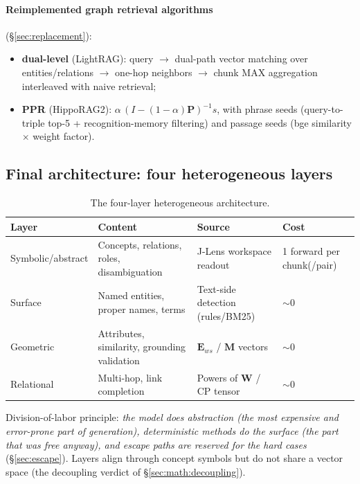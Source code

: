 \paragraph{Reimplemented graph retrieval algorithms} (\S\ref{sec:replacement}):
\begin{itemize}
\item \textbf{dual-level} (LightRAG): query $\to$ dual-path vector matching
over entities/relations $\to$ one-hop neighbors $\to$ chunk MAX aggregation
interleaved with naive retrieval;
\item \textbf{PPR} (HippoRAG2): $\alpha\,(I - (1-\alpha)\mathbf{P})^{-1} s$,
with phrase seeds (query-to-triple top-5 + recognition-memory filtering) and
passage seeds (bge similarity $\times$ weight factor).
\end{itemize}

\subsection{Final architecture: four heterogeneous layers}
\label{sec:method:arch}

\begin{table}[t]
\centering
\caption{The four-layer heterogeneous architecture.}
\label{tab:arch}
\begin{tabular}{@{}llll@{}}
\toprule
Layer & Content & Source & Cost \\
\midrule
Symbolic/abstract & Concepts, relations, roles, disambiguation & J-Lens workspace readout & 1 forward per chunk(/pair) \\
Surface & Named entities, proper names, terms & Text-side detection (rules/BM25) & $\sim 0$ \\
Geometric & Attributes, similarity, grounding validation & $\mathbf{E}_{ws}$ / $\mathbf{M}$ vectors & $\sim 0$ \\
Relational & Multi-hop, link completion & Powers of $\mathbf{W}$ / CP tensor & $\sim 0$ \\
\bottomrule
\end{tabular}
\end{table}

Division-of-labor principle: \emph{the model does abstraction (the most
expensive and error-prone part of generation), deterministic methods do the
surface (the part that was free anyway), and escape paths are reserved for the
hard cases} (\S\ref{sec:escape}). Layers align through concept symbols but do
not share a vector space (the decoupling verdict of
\S\ref{sec:math:decoupling}).
